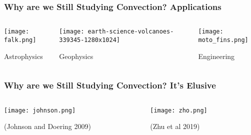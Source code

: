 \section{}%

\begin{frame}[fragile]
    \frametitle{Why are we Still Studying Convection? \textbf{Applications}}
    \vfill
    \begin{columns}
        \begin{column}{.30\textwidth}
            \centering
            \texttt{[image: falk.png]}

            {Astrophysics}
        \end{column}

        \begin{column}{.3\textwidth}
            \centering
            \texttt{[image: earth-science-volcanoes-339345-1280x1024]}

            {Geophysics}
        \end{column}

        \begin{column}{.30\textwidth}
            \centering
            \texttt{[image: moto\_fins.png]}

            {Engineering}
        \end{column}
    \end{columns}
\end{frame}

\begin{frame}[fragile]
    \frametitle{Why are we Still Studying Convection? \textbf{It's Elusive}}
    \vfill
    \begin{columns}
        \begin{column}{.30\textwidth}
            \centering
            \texttt{[image: johnson.png]}

            {(Johnson and Doering 2009)}
        \end{column}

        \begin{column}{.60\textwidth}
            \centering
            \texttt{[image: zho.png]}

            {(Zhu et al 2019)}
        \end{column}
    \end{columns}
\end{frame}


